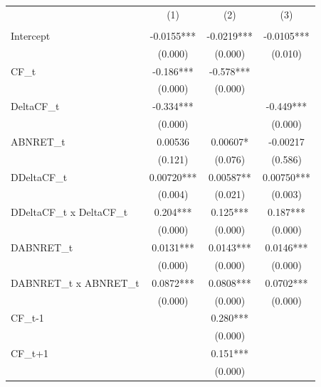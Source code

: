 {
\def\sym#1{\ifmmode^{#1}\else\(^{#1}\)\fi}
\begin{tabular}{l*{3}{c}}
\hline\hline
                    &\multicolumn{1}{c}{(1)}&\multicolumn{1}{c}{(2)}&\multicolumn{1}{c}{(3)}\\
                    &\multicolumn{1}{c}{}&\multicolumn{1}{c}{}&\multicolumn{1}{c}{}\\
\hline
Intercept           &     -0.0155***&     -0.0219***&     -0.0105***\\
                    &     (0.000)   &     (0.000)   &     (0.010)   \\
[1em]
CF\_t                &      -0.186***&      -0.578***&               \\
                    &     (0.000)   &     (0.000)   &               \\
[1em]
DeltaCF\_t           &      -0.334***&               &      -0.449***\\
                    &     (0.000)   &               &     (0.000)   \\
[1em]
ABNRET\_t            &     0.00536   &     0.00607*  &    -0.00217   \\
                    &     (0.121)   &     (0.076)   &     (0.586)   \\
[1em]
DDeltaCF\_t          &     0.00720***&     0.00587** &     0.00750***\\
                    &     (0.004)   &     (0.021)   &     (0.003)   \\
[1em]
DDeltaCF\_t x DeltaCF\_t&       0.204***&       0.125***&       0.187***\\
                    &     (0.000)   &     (0.000)   &     (0.000)   \\
[1em]
DABNRET\_t           &      0.0131***&      0.0143***&      0.0146***\\
                    &     (0.000)   &     (0.000)   &     (0.000)   \\
[1em]
DABNRET\_t x ABNRET\_t&      0.0872***&      0.0808***&      0.0702***\\
                    &     (0.000)   &     (0.000)   &     (0.000)   \\
[1em]
CF\_{t-1}            &               &       0.280***&               \\
                    &               &     (0.000)   &               \\
[1em]
CF\_{t+1}            &               &       0.151***&               \\
                    &               &     (0.000)   &               \\

\end{tabular}}
